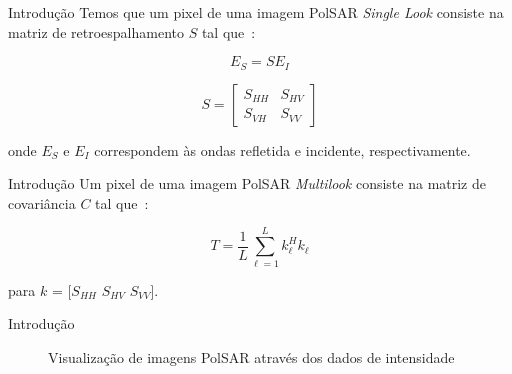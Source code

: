 \documentclass{beamer} %
\begin{document}
\begin{frame}{Introdução}
    Temos que um pixel de uma imagem PolSAR \textit{Single Look} consiste na matriz de retroespalhamento $S$ tal que~\cite{Pottier09}:
    
    \begin{equation}
        E_S = S E_I
    \end{equation}
    
    \begin{equation}
        S = 
        \begin{bmatrix}
            S_{HH} & S_{HV}\\
            S_{VH} & S_{VV}
        \end{bmatrix}
    \end{equation}
    
    onde $E_S$ e $E_I$ correspondem às ondas refletida e incidente, respectivamente.
\end{frame}

\begin{frame}{Introdução}
    Um pixel de uma imagem PolSAR \textit{Multilook} consiste na matriz de covariância $C$ tal que~\cite{Pottier09}:
    
    \begin{equation}
        T = \frac{1}{L} \sum_{\ell=1}^L k^H_{\ell} k_{\ell} 
    \end{equation}
    
    para $k$ = [$S_{HH}$ $S_{HV}$  $S_{VV}$].
\end{frame}

\begin{frame}{Introdução}
    
    \begin{figure}%
        \centering
        \qquad
        \caption{Visualização de imagens PolSAR através dos dados de intensidade}%
        \label{fig:example}%
    \end{figure}
    
\end{frame}
\end{document}
